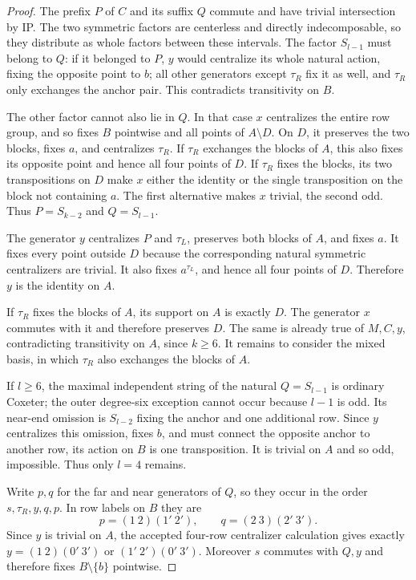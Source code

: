 \documentclass[11pt,a4paper]{article}
\begin{document}
\begin{proof}
The prefix $P$ of $C$ and its suffix $Q$ commute and have
trivial intersection by IP. The two symmetric factors are
centerless and directly indecomposable, so they distribute
as whole factors between these intervals. The factor
$S_{l-1}$ must belong to $Q$: if it belonged to $P$,
$y$ would centralize its whole natural action, fixing the
opposite point to $b$; all other generators except $\tau_R$
fix it as well, and $\tau_R$ only exchanges the anchor
pair. This contradicts transitivity on $B$.

The other factor cannot also lie in $Q$. In that case $x$
centralizes the entire row group, and so fixes $B$ pointwise
and all points of $A\setminus D$. On $D$, it preserves
the two blocks, fixes $a$, and centralizes $\tau_R$.
If $\tau_R$ exchanges the blocks of $A$, this also fixes
its opposite point and hence all four points of $D$.
If $\tau_R$ fixes the blocks, its two transpositions on
$D$ make $x$ either the identity or the single
transposition on the block not containing $a$.
The first alternative makes $x$ trivial, the second odd.
Thus $P=S_{k-2}$ and $Q=S_{l-1}$.

The generator $y$ centralizes $P$ and $\tau_L$, preserves
both blocks of $A$, and fixes $a$. It fixes every point
outside $D$ because the corresponding natural symmetric
centralizers are trivial. It also fixes $a^{\tau_L}$,
and hence all four points of $D$. Therefore $y$ is the
identity on $A$.

If $\tau_R$ fixes the blocks of $A$, its support on $A$
is exactly $D$. The generator $x$ commutes with it and
therefore preserves $D$. The same is already true of
$M,C,y$, contradicting transitivity on $A$, since $k\geq6$.
It remains to consider the mixed basis, in which $\tau_R$
also exchanges the blocks of $A$.

If $l\geq6$, the maximal independent string of the natural
$Q=S_{l-1}$ is ordinary Coxeter; the outer degree-six
exception cannot occur because $l-1$ is odd. Its near-end
omission is $S_{l-2}$ fixing the anchor and one additional
row. Since $y$ centralizes this omission, fixes $b$, and
must connect the opposite anchor to another row, its action
on $B$ is one transposition. It is trivial on $A$ and so
odd, impossible. Thus only $l=4$ remains.

Write $p,q$ for the far and near generators of $Q$, so
they occur in the order $s,\tau_R,y,q,p$. In row labels
on $B$ they are
\[
 p=(1\ 2)(1'\ 2'),\qquad q=(2\ 3)(2'\ 3').
\]
Since $y$ is trivial on $A$, the accepted four-row
centralizer calculation gives exactly
$y=(1\ 2)(0'\ 3')$ or $(1'\ 2')(0'\ 3')$.
Moreover $s$ commutes with $Q,y$ and therefore fixes
$B\setminus\{b\}$ pointwise.


\end{proof}
\end{document}
